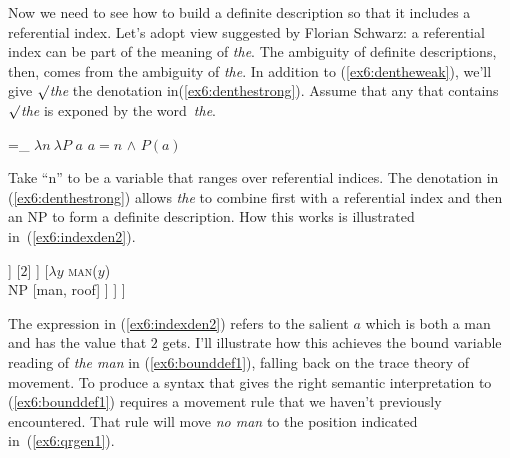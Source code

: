 Now we need to see how to build a definite description so that it includes a referential index. Let's adopt view suggested by Florian Schwarz\cite{Schwarz:2009}: a referential index can be part of the meaning of \emph{the}. The ambiguity of definite descriptions, then, comes from the ambiguity of \emph{the}. In addition to (\ref{ex6:dentheweak}), we'll give \emph{$\surd$the} the denotation in(\ref{ex6:denthestrong}). Assume that any  that contains \emph{$\surd$the} is exponed by the word~\emph{the}.
\begin{exe}
\raggedright
	\ex \label{ex6:denthestrong}
	 =_{} $\lambda n\ \lambda P$ \rotiota $a$ $a=n$ $\wedge$ $P(a)$
\end{exe}
%
%
%
%
Take ``n'' to be a variable that ranges over referential indices. The denotation in (\ref{ex6:denthestrong}) allows \emph{the} to combine first with a referential index and then an NP to form a definite description. How this works is illustrated in~(\ref{ex6:indexden2}).
\begin{exe}
\raggedright
	\ex \label{ex6:indexden2}
	\begin{forest}
	[DP [\rotiota$a$ $a${=}$2$ $\wedge$ \textsc{man}($a$)\\\ibar{D}
		[$\lambda P$ \rotiota $a$ $a${=}$2$ $\wedge$ $P(a)$\\\obar{D}
		[$\lambda n\ \lambda P$ \rotiota$a$ $a${=}$n$ $\wedge$ $P(a)$\\\obar{D} [$\surd$the] ]
		[$2$]
		]
			[$\lambda y$ \textsc{man}($y$)\\NP [man, roof] ]
			]
			]
	\end{forest}
\end{exe}
The expression in (\ref{ex6:indexden2}) refers to the salient $a$ which is both a man and has the value that $2$ gets. I'll illustrate how this achieves the bound variable reading of \emph{the man} in (\ref{ex6:bounddef1}), falling back on the trace theory of movement. To produce a syntax that gives the right semantic interpretation to (\ref{ex6:bounddef1}) requires a movement rule that we haven't previously encountered. That rule will move \emph{no man} to the position indicated in~(\ref{ex6:qrgen1}). 
